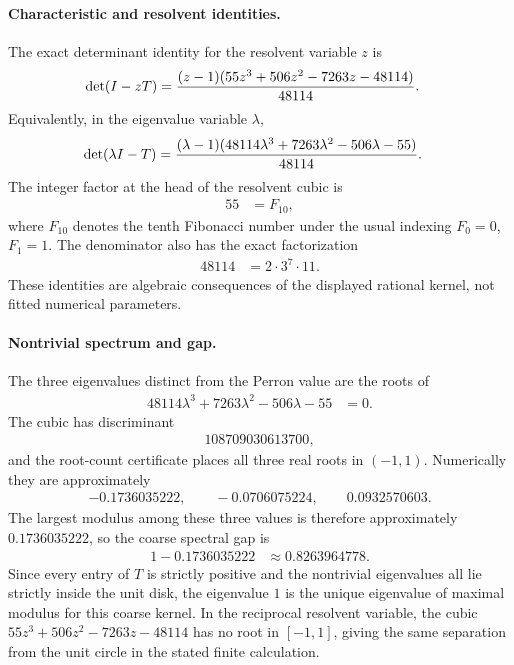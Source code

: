 \paragraph{Characteristic and resolvent identities.}
The exact determinant identity for the resolvent variable $z$ is
$$
\begin{aligned}
\det(I-zT)&={(z-1)(55z^3+506z^2-7263z-48114)\over 48114}.
\end{aligned}
$$
Equivalently, in the eigenvalue variable $\lambda$,
$$
\begin{aligned}
\det(\lambda I-T)&={(\lambda-1)(48114\lambda^3+7263\lambda^2-506\lambda-55)\over 48114}.
\end{aligned}
$$
The integer factor at the head of the resolvent cubic is
$$
\begin{aligned}
55&=F_{10},
\end{aligned}
$$
where $F_{10}$ denotes the tenth Fibonacci number under the usual indexing $F_0=0$, $F_1=1$.  The denominator also has the exact factorization
$$
\begin{aligned}
48114&=2\cdot 3^7\cdot 11.
\end{aligned}
$$
These identities are algebraic consequences of the displayed rational kernel, not fitted numerical parameters.

\paragraph{Nontrivial spectrum and gap.}
The three eigenvalues distinct from the Perron value are the roots of
$$
\begin{aligned}
48114\lambda^3+7263\lambda^2-506\lambda-55&=0.
\end{aligned}
$$
The cubic has discriminant
$$
\begin{aligned}
108709030613700,
\end{aligned}
$$
and the root-count certificate places all three real roots in $(-1,1)$.  Numerically they are approximately
$$
\begin{aligned}
-0.1736035222,\qquad -0.0706075224,\qquad 0.0932570603.
\end{aligned}
$$
The largest modulus among these three values is therefore approximately $0.1736035222$, so the coarse spectral gap is
$$
\begin{aligned}
1-0.1736035222&\approx 0.8263964778.
\end{aligned}
$$
Since every entry of $T$ is strictly positive and the nontrivial eigenvalues all lie strictly inside the unit disk, the eigenvalue $1$ is the unique eigenvalue of maximal modulus for this coarse kernel.  In the reciprocal resolvent variable, the cubic $55z^3+506z^2-7263z-48114$ has no root in $[-1,1]$, giving the same separation from the unit circle in the stated finite calculation.

